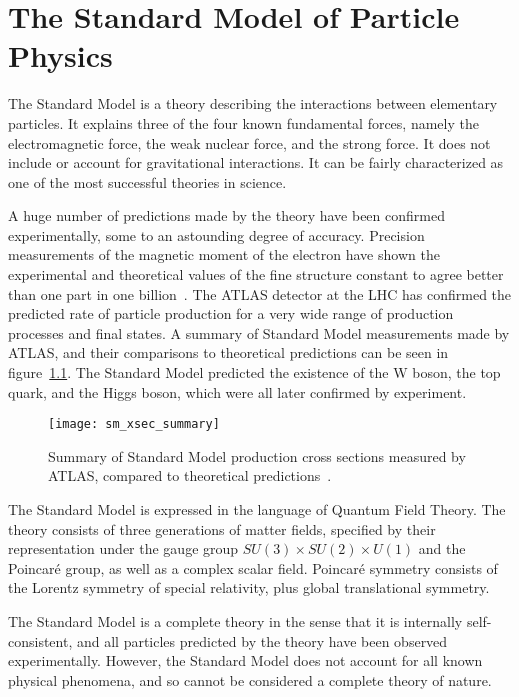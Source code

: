 \chapter{The Standard Model of Particle Physics}\label{ch:sm}

The Standard Model is a theory describing the interactions between elementary particles.
It explains three of the four known fundamental forces, namely the electromagnetic force,
the weak nuclear force, and the strong force.
It does not include  or account for gravitational interactions.
It can be fairly characterized as one of the most successful theories in science.

A huge number of predictions made by the theory have been confirmed experimentally, some to an astounding degree of accuracy.
Precision measurements of the magnetic moment of the electron have shown the experimental and theoretical values of the fine structure constant to agree better than one part in one billion~\cite{sm-fine-structure-2008}.
The ATLAS detector at the LHC has confirmed the predicted rate of particle production for a very wide range of production processes and final states.
A summary of Standard Model measurements made by ATLAS, and their comparisons to theoretical predictions can be seen in figure~\ref{fig:sm_xsec_summary}.
The Standard Model predicted the existence of the W boson, the top quark, and the Higgs boson, which were all later confirmed by experiment.

\begin{figure}[!ht]
    \centering
\texttt{[image: sm\_xsec\_summary]}
\caption{Summary of Standard Model production cross sections measured by ATLAS, compared to theoretical predictions~\cite{sm-summary-plots}.}
\label{fig:sm_xsec_summary}
\end{figure}

The Standard Model is expressed in the language of Quantum Field Theory.
The theory consists of three generations of matter fields, specified by their representation under the gauge group $SU(3)\times SU(2)\times U(1)$ and the Poincar\'e group, as well as a complex scalar field.
Poincar\'e symmetry consists of the Lorentz symmetry of special relativity, plus global translational symmetry.

The Standard Model is a complete theory in the sense that it is internally self-consistent,
and all particles predicted by the theory have been observed experimentally.
However, the Standard Model does not account for all known physical phenomena,
and so cannot be considered a complete theory of nature.

